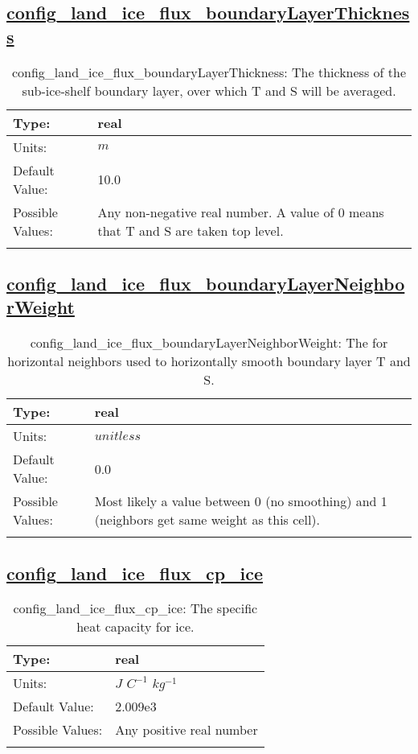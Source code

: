\subsection[config\_land\_ice\_flux\_boundaryLayerThickness]{\hyperref[sec:nm_tab_land_ice_fluxes]{config\_land\_ice\_flux\_boundaryLayerThickness}}
\label{subsec:nm_sec_config_land_ice_flux_boundaryLayerThickness}
\begin{center}
\begin{longtable}{| p{2.0in} || p{4.0in} |}
    \hline
    Type: & real \\
    \hline
    Units: & $m$ \\
    \hline
    Default Value: & 10.0 \\
    \hline
    Possible Values: & Any non-negative real number.  A value of 0 means that T and S are taken top level. \\
    \hline
    \caption{config\_land\_ice\_flux\_boundaryLayerThickness: The thickness of the sub-ice-shelf boundary layer, over which T and S will be averaged.}
\end{longtable}
\end{center}
\subsection[config\_land\_ice\_flux\_boundaryLayerNeighborWeight]{\hyperref[sec:nm_tab_land_ice_fluxes]{config\_land\_ice\_flux\_boundaryLayerNeighborWeight}}
\label{subsec:nm_sec_config_land_ice_flux_boundaryLayerNeighborWeight}
\begin{center}
\begin{longtable}{| p{2.0in} || p{4.0in} |}
    \hline
    Type: & real \\
    \hline
    Units: & $unitless$ \\
    \hline
    Default Value: & 0.0 \\
    \hline
    Possible Values: & Most likely a value between 0 (no smoothing) and 1 (neighbors get same weight as this cell). \\
    \hline
    \caption{config\_land\_ice\_flux\_boundaryLayerNeighborWeight: The for horizontal neighbors used to horizontally smooth boundary layer T and S.}
\end{longtable}
\end{center}
\subsection[config\_land\_ice\_flux\_cp\_ice]{\hyperref[sec:nm_tab_land_ice_fluxes]{config\_land\_ice\_flux\_cp\_ice}}
\label{subsec:nm_sec_config_land_ice_flux_cp_ice}
\begin{center}
\begin{longtable}{| p{2.0in} || p{4.0in} |}
    \hline
    Type: & real \\
    \hline
    Units: & $J$ $C^{-1}$ $kg^{-1}$ \\
    \hline
    Default Value: & 2.009e3 \\
    \hline
    Possible Values: & Any positive real number \\
    \hline
    \caption{config\_land\_ice\_flux\_cp\_ice: The specific heat capacity for ice.}
\end{longtable}
\end{center}
